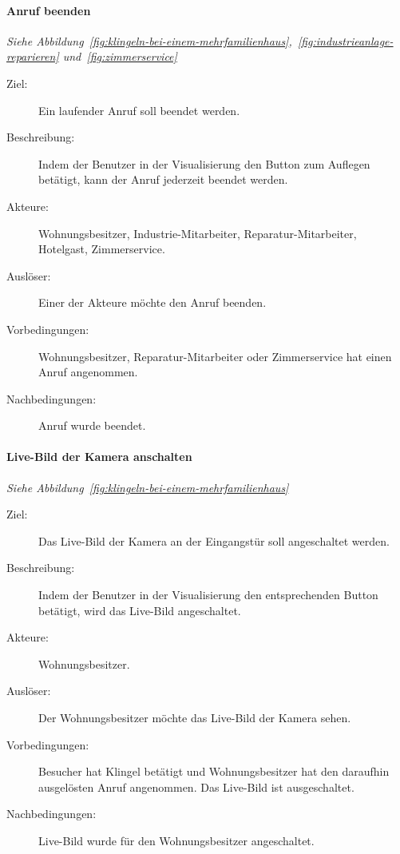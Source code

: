 \paragraph{\large{Anruf beenden}}
\textit{Siehe Abbildung~\ref{fig:klingeln-bei-einem-mehrfamilienhaus},~\ref{fig:industrieanlage-reparieren} und~\ref{fig:zimmerservice}}
    \begin{description}
        \item[Ziel:] Ein laufender Anruf soll beendet werden.
        \item[Beschreibung:] Indem der Benutzer in der Visualisierung den Button zum Auflegen betätigt, kann der Anruf jederzeit beendet werden.
        \item[Akteure:] Wohnungsbesitzer, Industrie-Mitarbeiter, Reparatur-Mitarbeiter, Hotelgast, Zimmerservice.
        \item[Auslöser:] Einer der Akteure möchte den Anruf beenden.
        \item[Vorbedingungen:] Wohnungsbesitzer, Reparatur-Mitarbeiter oder Zimmerservice hat einen Anruf angenommen.
        \item[Nachbedingungen:] Anruf wurde beendet.
    \end{description}
    
\paragraph{\large{Live-Bild der Kamera anschalten}}
\textit{Siehe Abbildung~\ref{fig:klingeln-bei-einem-mehrfamilienhaus}}
    \begin{description}
        \item[Ziel:] Das Live-Bild der Kamera an der Eingangstür soll angeschaltet werden.
        \item[Beschreibung:] Indem der Benutzer in der Visualisierung den entsprechenden Button betätigt, wird das Live-Bild angeschaltet.
        \item[Akteure:] Wohnungsbesitzer.
        \item[Auslöser:] Der Wohnungsbesitzer möchte das Live-Bild der Kamera sehen.
        \item[Vorbedingungen:] Besucher hat Klingel betätigt und Wohnungsbesitzer hat den daraufhin ausgelösten Anruf angenommen.
            Das Live-Bild ist ausgeschaltet.
        \item[Nachbedingungen:] Live-Bild wurde für den Wohnungsbesitzer angeschaltet.
    \end{description}

